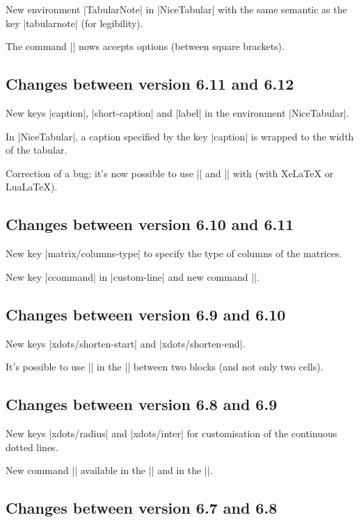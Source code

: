\documentclass[dvipsnames]{article}%
\begin{document}
New environment |{TabularNote}| in |{NiceTabular}| with the same semantic as
the key |tabularnote| (for legibility).

The command |\Hline| nows accepts options (between square brackets).

\subsection*{Changes between version 6.11 and 6.12}

New keys |caption|, |short-caption| and |label| in the environment
|{NiceTabular}|. 

In |{NiceTabular}|, a caption specified by the key |caption| is wrapped to the 
width of the tabular.

Correction of a bug: it's now possible to use |\OverBrace| and |\UnderBrace|
with  (with XeLaTeX or LuaLaTeX).

\subsection*{Changes between version 6.10 and 6.11}

New key |matrix/columns-type| to specify the type of columns of the matrices.

New key |ccommand| in |custom-line| and new command |\cdottedline|.

\subsection*{Changes between version 6.9 and 6.10}

New keys |xdots/shorten-start| and |xdots/shorten-end|.

It's possible to use |\line| in the |\CodeAfter| between two blocks (and not
only two cells).

\subsection*{Changes between version 6.8 and 6.9}

New keys |xdots/radius| and |xdots/inter| for customisation of the continuous
dotted lines.

New command |\ShowCellNames| available in the |\CodeBefore| and in the |\CodeAfter|.

\subsection*{Changes between version 6.7 and 6.8}
\end{document}
